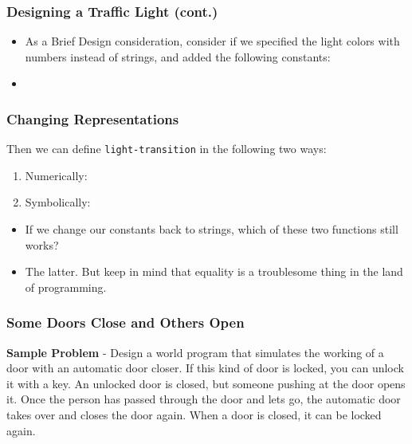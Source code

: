 \documentclass{beamer}
\begin{document}



\begin{frame}
  \frametitle{Designing a Traffic Light (cont.)}
  \lightTransitionFull
  \begin{itemize}
  \item<2-> As a Brief Design consideration, consider if we
    specified the light colors with numbers instead of strings,
    and added the following constants:
  \item<3-> \lightNumbers  
  \end{itemize}
\end{frame}

\begin{frame}
  \frametitle{Changing Representations}
  Then we can define \texttt{light-transition}
  in the following two ways:
  \begin{enumerate}
  \item<2-> Numerically: \lightNumeric
  \item<3-> Symbolically: \lightSymbolic
  \end{enumerate}
  \begin{itemize}
  \item<4-> If we change our constants back to strings, which of
    these two functions still works?
  \item<5-> The latter. But keep in mind that equality is a troublesome
    thing in the land of programming.
  \end{itemize}
\end{frame}

\begin{frame}
  \frametitle{Some Doors Close and Others Open}
  \textbf{Sample Problem} - Design a world program that simulates the working of a door with an automatic door closer. If this kind of door is locked, you can unlock it with a key. An unlocked door is closed, but someone pushing at the door opens it. Once the person has passed through the door and lets go, the automatic door takes over and closes the door again. When a door is closed, it can be locked again.
\end{frame}
\end{document}
